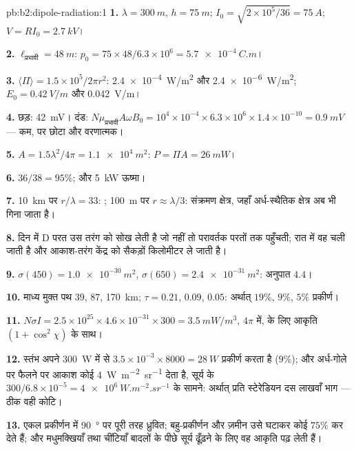 \begin{solution}{pb:b2:dipole-radiation:1}
\textbf{1.} $\lambda = \qty{300}{m}$, $h = \qty{75}{m}$; $I_0 = \sqrt{2 \times 10^5/36} = \qty{75}{A}$;
$V = RI_0 = \qty{2.7}{kV}$।

\textbf{2.} $\ell_{\text{प्रभावी}} = \qty{48}{m}$: $p_0 = 75 \times 48/6.3 \times 10^6 = \qty{5.7e-4}{C.m}$।

\textbf{3.} $\langle\Pi\rangle = 1.5 \times 10^5/2\pi r^2$: \qty{2.4e-4}{W/m^2} और \qty{2.4e-6}{W/m^2};
$E_0 = \qty{0.42}{V/m}$ और \qty{0.042}{V/m}।

\textbf{4.} छड़: \qty{42}{mV}। दंड: $N\mu_{\text{प्रभावी}}A\omega B_0 = 10^4 \times 10^{-4} \times 6.3 \times
10^6 \times 1.4 \times 10^{-10} = \qty{0.9}{mV}$ --- कम, पर छोटा और वरणात्मक।

\textbf{5.} $A = 1.5\lambda^2/4\pi = \qty{1.1e4}{m^2}$: $P = \Pi A = \qty{26}{mW}$।

\textbf{6.} $36/38 = 95\%$; और \qty{5}{kW} ऊष्मा।

\textbf{7.} \qty{10}{km} पर $r/\lambda = 33$: ; \qty{100}{m} पर
$r \approx \lambda/3$: संक्रमण क्षेत्र, जहाँ अर्ध-स्थैतिक क्षेत्र अब भी
गिना जाता है।

\textbf{8.} दिन में D परत उस तरंग को सोख लेती है जो नहीं तो
परावर्तक परतों तक पहुँचती; रात में वह चली जाती है और आकाश-तरंग
केंद्र को सैकड़ों किलोमीटर ले जाती है।

\textbf{9.} $\sigma(450) = \qty{1.0e-30}{m^2}$, $\sigma(650) = \qty{2.4e-31}{m^2}$: अनुपात $4.4$।

\textbf{10.} माध्य मुक्त पथ $39$, $87$, \qty{170}{km}; $\tau = 0.21$, $0.09$, $0.05$:
अर्थात् $19\%$, $9\%$, $5\%$ प्रकीर्ण।

\textbf{11.} $N\sigma I = 2.5 \times 10^{25} \times 4.6 \times 10^{-31} \times 300 = \qty{3.5}{mW/m^3}$,
$4\pi$ में,  के लिए आकृति $(1 + \cos^2\chi)$ के साथ।

\textbf{12.} स्तंभ अपने \qty{300}{W} में से $3.5 \times 10^{-3} \times 8000 = \qty{28}{W}$
प्रकीर्ण करता है ($9\%$); और अर्ध-गोले पर फैलने पर आकाश कोई
\qty{4}{W.m^{-2}.sr^{-1}} देता है, सूर्य के $300/6.8 \times 10^{-5} = \qty{4e6}{W.m^{-2}.sr^{-1}}$ के सामने:
अर्थात् प्रति स्टेरेडियन दस लाखवाँ भाग --- ठीक वही कोटि।

\textbf{13.} एकल प्रकीर्णन में \qty{90}{\degree} पर पूरी तरह ध्रुवित; बहु-प्रकीर्णन
और ज़मीन उसे घटाकर कोई $75\%$ कर देते हैं; और मधुमक्खियाँ तथा चींटियाँ
बादलों के पीछे सूर्य ढूँढ़ने के लिए वह आकृति पढ़ लेती हैं।


\end{solution}

